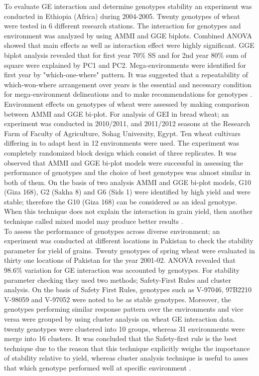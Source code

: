   To evaluate GE interaction and determine genotypes stability an experiment was conducted in Ethiopia (Africa) during 2004-2005. Twenty genotypes of wheat were tested in 6 different research stations. The interaction for genotypes and environment was analyzed by using AMMI and GGE biplots. Combined ANOVA showed that main effects as well as interaction effect were highly significant. GGE biplot analysis revealed that for first year 70\% SS and for 2nd year 80\% sum of square were explained by PC1 and PC2. Mega-environments were identified for first year by "which-one-where" pattern. It was suggested that a repeatability of which-won-where arrangement over years is the essential and necessary condition for mega-environment delineations and to make recommendations for genotypes \citep{Negash2013}. \\ 
  
  Environment effects on genotypes of wheat were assessed by making comparison between AMMI and GGE bi-plot. For analysis of GEI in bread wheat; an experiment was conducted in 2010/2011, and 2011/2012 seasons at the Research Farm of Faculty of Agriculture, Sohag University, Egypt. Ten wheat cultivars differing in to adapt heat in 12 environments were used. The experiment was completely randomized block design which consist of three replicates. It was observed that AMMI and GGE bi-plot models were successful in assessing the performance of genotypes and the choice of best genotypes was almost similar in both of them. On the basis of two analysis AMMI and GGE bi-plot models, G10 (Giza 168), G2 (Sakha 8) and G6 (Sids 1) were identified by high yield and were stable; therefore the G10 (Giza 168) can be considered as an ideal genotype. When this technique does not explain the interaction in grain yield, then another technique called mixed model may produce better results \citep{Mohamed2013}. \\
 
  To assess the performance of genotypes across diverse environment; an experiment was conducted at different locations in Pakistan to check the stability parameter for yield of grains. Twenty genotypes of spring wheat were evaluated in thirty one locations of Pakistan for the year 2001-02. ANOVA revealed that 98.6\% variation for GE interaction was accounted by genotypes. For stability parameter checking they used two methods; Safety-First Rules and cluster analysis. On the basis of Safety First Rules, genotypes such as V-97046, 97B2210 V-98059 and V-97052 were noted to be as stable genotypes. Moreover, the genotypes performing similar response pattern over the environments and vice versa were grouped by using cluster analysis on wheat GE interaction data. twenty genotypes were clustered into 10 groups, whereas 31 environments were merge into 16 clusters. It was concluded that the Safety-first rule is the best technique due to the reason that this technique explicitly weighs the importance of stability relative to yield, whereas cluster analysis technique is useful to asses that which genotype performed well at specific environment \citep{Rasul2007}. \\ 
 
